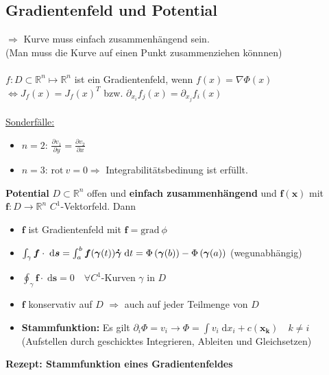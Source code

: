 \documentclass[6pt,a4paper]{scrartcl}
\renewcommand{\vec}[1]{\ensuremath{\boldsymbol {#1}}}                                           %
\renewcommand{\emph}[1]{\textbf{#1}}                                                            %
\renewcommand*{\dot}[1]{\accentset{\mbox{\textrm{\large\bfseries .}} }{#1}}                     %
\newcommand{\Ra}[0]{\ensuremath{\Rightarrow}}                                  %
\newcommand{\ra}[0]{\ensuremath{\rightarrow}}                                  %
\newcommand{\diff}{\ensuremath{\;\mathrm d}}                                   %
\newcommand{\grad}{\ensuremath{\mathrm{grad}\ }}                               %
\newcommand{\rot}{\ensuremath{\mathrm{rot}\ }}                                 %
\newcommand{\R}{\ensuremath{\mathbb R}}
\begin{document}
\begin{multicols*}{4}
    \subsection{Gradientenfeld und Potential} %
    $\Ra$ Kurve muss einfach zusammenhängend sein. \\
    (Man muss die Kurve auf einen Punkt zusammenziehen könnnen) \\ \\
    $f:D \subset \R^n \mapsto \R^n$ ist ein Gradientenfeld, wenn $f(x) = \nabla{\Phi(x)}$ \\
    $\Leftrightarrow \boxed{J_f(x) = J_f(x)^T}$ bzw. $\partial_{x_i}f_j(x) = \partial_{x_j}f_i(x)$ \\ \\
    \underline{Sonderfälle:}
    \begin{itemize} \itemsep0pt
        \item $n = 2$: $\frac{\partial v_1}{\partial y} = \frac{\partial v_2}{\partial x}$
        \item $n = 3$: $\rot v = 0 \Ra $ Integrabilitätsbedinung ist erfüllt.
    \end{itemize}

    \textbf{Potential}
    $D \subset \R^n$ offen und \emph{einfach zusammenhängend} und $\vec{f}(\vec{x})$ mit $\vec{f}:D \ra \R^n$ $C^1$-Vektorfeld.
    Dann
    \begin{itemize}
        \item $\vec{f}$ ist Gradientenfeld mit $\vec{f} = \grad{\phi}$
        \item $\int_{\gamma}{\vec{f} \cdot \diff \vec{s}} = \int_a^b \vec f(\vec \gamma(t)) \dot{\vec \gamma} \diff t = \Phi\left(\vec{\gamma}(b)\right) - \Phi\left(\vec{\gamma}(a)\right)$ (wegunabhängig)
        \item $\oint_{\gamma}{\vec{f} \cdot \diff \vec{s}} = 0 \quad \forall C^1$-Kurven $\gamma$ in $D$
        \item $\vec{f}$ konservativ auf $D$ $\Ra$ auch auf jeder Teilmenge von $D$
        \item \emph{Stammfunktion:} Es gilt $\partial_i \Phi = v_i \ra \Phi = \int{v_i \diff x_i} + c(\vec{x_k}) \quad k \neq i$ (Aufstellen durch geschicktes Integrieren, Ableiten und Gleichsetzen)
    \end{itemize}


    \textbf{Rezept: Stammfunktion eines Gradientenfeldes} \\


\end{multicols*}
\end{document}
